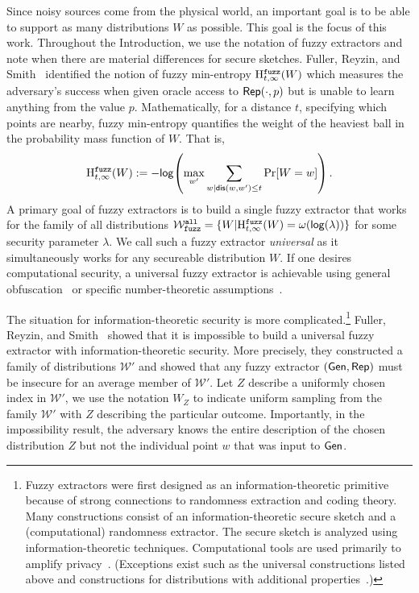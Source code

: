   
Since noisy sources come from the physical world, an important goal
  is to be able to support as many distributions $W$ as possible. This goal is the focus of this work. 
  Throughout the Introduction, we use the notation of fuzzy extractors
  and note when there are material differences for secure sketches.
  Fuller, Reyzin, and Smith~\cite{fuller2016fuzzy,fuller2020fuzzy}
  identified the notion of fuzzy min-entropy $\mathrm{H}^{\mathtt{fuzz}}_{t,\infty}(W)$ which
  measures the adversary's success when given oracle access to
  ${\mathsf{Rep}}(\cdot, p)$ but is unable to learn anything from the value $p$.
  Mathematically, for a distance $t$, specifying which points are
  nearby, fuzzy min-entropy quantifies the weight of the heaviest ball
  in the probability mass function of $W$.  That is,
\[
\mathrm{H}^{\mathtt{fuzz}}_{t,\infty}(W):= -\mathsf{log}\!\left(\max_{w'} \sum_{w | \mathsf{dis}(w, w')\le t} \Pr[W=w]\right).
\]A primary goal of fuzzy extractors is to build a single fuzzy extractor that works for the family of all distributions $\mathcal{W}_{\mathtt{fuzz}}^{\mathtt{all}} = \{ W | \mathrm{H}^{\mathtt{fuzz}}_{t,\infty}(W) = \omega(\mathsf{log}\!\left(\lambda\right))\}$ for some security parameter $\lambda$.  We call such a fuzzy extractor \emph{universal} as it simultaneously works for any secureable distribution $W$. 
If one desires computational security, a universal fuzzy extractor is achievable using general obfuscation~\cite{BarakBCKPS13,BitanskyCKP14,bitansky2017virtual} or specific number-theoretic assumptions~\cite{galbraith2019obfuscated}. 


The situation for information-theoretic security is more complicated.\footnote{Fuzzy extractors were first designed as an information-theoretic primitive because of strong connections to randomness extraction and coding theory.  Many constructions consist of an information-theoretic secure sketch and a (computational) randomness extractor.  The secure sketch is analyzed using information-theoretic techniques.  Computational tools are used primarily to amplify privacy~\cite{wen2018robustly,wen2019generic}.  (Exceptions exist such as the universal constructions listed above and constructions for distributions with additional properties~\cite{apon2017efficient,alamelou2018pseudoentropic,fuller2020computational,canetti2021reusable}.)
}  Fuller, Reyzin, and Smith~\cite{fuller2020fuzzy} showed that it is impossible to build a universal fuzzy extractor with information-theoretic security.  More precisely, they constructed a family of distributions $\mathcal{W}'$ and showed that any fuzzy extractor $({\mathsf{Gen}}, {\mathsf{Rep}})$ must be insecure for an average member of $\mathcal{W}'$. Let $Z$ describe a uniformly chosen index in $\mathcal{W'}$, we use the notation $W_Z$ to indicate uniform sampling from the family $\mathcal{W}'$ with $Z$ describing the particular outcome. Importantly, in the impossibility result, the adversary knows the entire description of the chosen distribution $Z$ but not the individual point $w$ that was input to ${\mathsf{Gen}}$.

